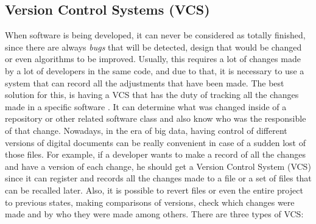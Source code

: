 \documentclass[mim_thesis.tex]{subfiles}
\begin{document}
\subsection{Version Control Systems (VCS)}
When software is being developed, it can never be considered as totally finished, since there are always \textit{bugs} that will be detected, design that would be changed or even algorithms to be improved. Usually, this requires a lot of changes made by a lot of developers in the same code, and due to that, it is necessary to use a system that can record all the adjustments that have been made. The best solution for this, is having a \ac{VCS} that has the duty of tracking all the changes made in a specific software \citep{loeliger2012version}. It can determine what was changed inside of a repository or other related software class and also know who was the responsible of that change. Nowadays, in the era of big data, having control of different versions of digital documents can be really convenient in case of a sudden lost of those files. For example, if a developer wants to make a record of all the changes and have a version of each change, he should get a Version Control System (VCS) since it can register and records all the changes made to a file or a set of files that can be recalled later. Also, it is possible to revert files or even the entire project to previous states, making comparisons of versions, check which changes were made and by who they were made among others. There are three types of \ac{VCS}:   
\end{document}
